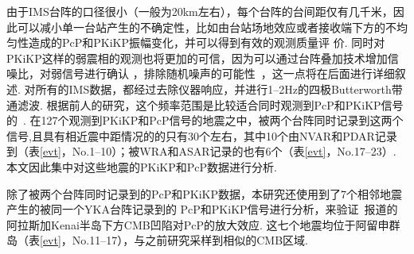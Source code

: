 由于IMS台阵的口径很小（一般为20km左右），每个台阵的台间距仅有几千米，因此可以减小单一台站产生的不确定性，比如由台站场地效应或者接收端下方的不均匀性造成的PcP和PKiKP振幅变化，并可以得到有效的观测质量评
价. 同时对PKiKP这样的弱震相的观测也将更加的可信，因为可以通过台阵叠加技术增加信噪比，对弱信号进行确认
，排除随机噪声的可能性~\citep{Rost2002}，这一点将在后面进行详细叙述. 对所有的IMS数据，都经过去除仪器响应，并进行1--2Hz的四极Butterworth带通滤波. 根据前人的研究，这个频率范围是比较适合同时观测到PcP和PKiKP信号的~\citep{Koper2004a,Poupinet2004}. 在127个观测到PKiKP和PcP信号的地震之中，被两个台阵同时记录到这两个信号,且具有相近震中距情况的的只有30个左右，其中10个由NVAR和PDAR记录到（表\ref{evt}，No.1--10）；被WRA和ASAR记录的也有6个（表\ref{evt}，No.17--23）. 本文因此集中对这些地震的PKiKP和PcP数据进行分析. 

除了被两个台阵同时记录到的PcP和PKiKP数据，本研究还使用到了7个相邻地震产生的被同一个YKA台阵记录到的
PcP和PKiKP信号进行分析，来验证~\citet{Rost2004a}报道的阿拉斯加Kenai半岛下方CMB凹陷对PcP的放大效应. 这七个地震均位于阿留申群岛（表\ref{evt}，No.11--17），与之前研究采样到相似的CMB区域. 

